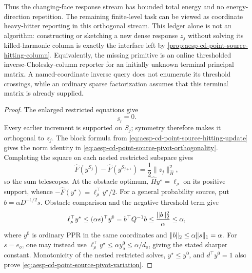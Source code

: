 \begin{proposition}
Thus the changing-face response stream has bounded total energy and no
energy-direction repetition.  The remaining finite-level task can be
viewed as coordinate heavy-hitter reporting in this orthogonal stream.
This ledger alone is not an algorithm: constructing or sketching a new
dense response \(z_j\) without solving its killed-harmonic column is exactly
the interface left by
\cref{prop:aesp-cd-point-source-hitting-column}.
Equivalently, the missing primitive is an online thresholded
inverse-Cholesky-column reporter for an initially unknown terminal principal
matrix.  A named-coordinate inverse query does not enumerate its threshold
crossings, while an ordinary sparse factorization assumes that this terminal
matrix is already supplied.
\end{proposition}

\begin{proof}
The enlarged restricted equations give
\begin{equation*}
 [\widehat H z_j]_{S_j}=0.
\end{equation*}
Every earlier increment is supported on \(S_j\); symmetry therefore makes
it orthogonal to \(z_j\).  The block formula from
\cref{eq:aesp-cd-point-source-hitting-update} gives the norm identity in
\cref{eq:aesp-cd-point-source-pivot-orthogonality}.  Completing the square
on each nested restricted subspace gives
\begin{equation*}
 \widehat F(y^{S_j})-\widehat F(y^{S_{j+1}})
 =\frac12\|z_j\|_{\widehat H}^2,
\end{equation*}
so the sum telescopes.  At the obstacle optimum,
\(\widehat Hy^\star=\ell_\rho\) on its positive support, whence
\(-\widehat F(y^\star)=\ell_\rho^\top y^\star/2\).
For a general probability source, put $b=\alpha D^{-1/2}s$.  Obstacle
comparison and the negative threshold term give
\begin{equation*}
 \ell_\rho^\top y^\star
 \leq (\alpha s)^\top y^0
 =b^\top Q^{-1}b
 \leq\frac{\lVert b\rVert_2^2}{\alpha}
 \leq\alpha,
\end{equation*}
where $y^0$ is ordinary PPR in the same coordinates and
\(\lVert b\rVert_2\leq\alpha\lVert s\rVert_1=\alpha\).  For $s=e_o$, one may instead
use
\(\ell_\rho^\top y^\star\leq\alpha y_o^0\leq\alpha/d_o\), giving the
stated sharper constant.  Monotonicity of the nested restricted solves,
\(y^\star\leq y^0\), and $d^\top y^0=1$ also prove
\cref{eq:aesp-cd-point-source-pivot-variation}.


\end{proof}
